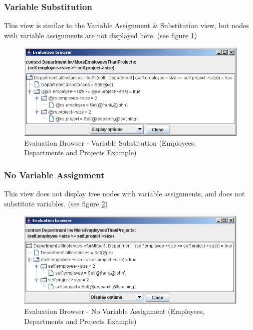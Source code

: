 \documentclass[a4paper,titlepage,oneside,final]{scrreprt} %
\begin{document}
\subsubsection{Variable Substitution}
This view is similar to the Variable Assignment \& Substitution view, but
nodes with variable assignments are not displayed here. (see figure \ref{fig:EvaluationBrowserSubstitution})
\begin{figure}[ht]
\centering
\includegraphics[scale=0.7]{Screenshots/GUI/EvaluationBrowserSubstitution.png}
\caption{Evaluation Browser - Variable Substitution (Employees, Departments and Projects Example)}
\label{fig:EvaluationBrowserSubstitution}
\end{figure}
\subsubsection{No Variable Assignment}
This view does not display tree nodes with variable assignments, and does not substitute variables.
(see figure \ref{fig:EvaluationBrowserNoAssignment})
\begin{figure}[ht]
\centering
\includegraphics[scale=0.7]{Screenshots/GUI/EvaluationBrowserNoAssignment.png}
\caption{Evaluation Browser - No Variable Assignment (Employees, Departments and Projects Example)}
\label{fig:EvaluationBrowserNoAssignment}
\end{figure}
\end{document}
